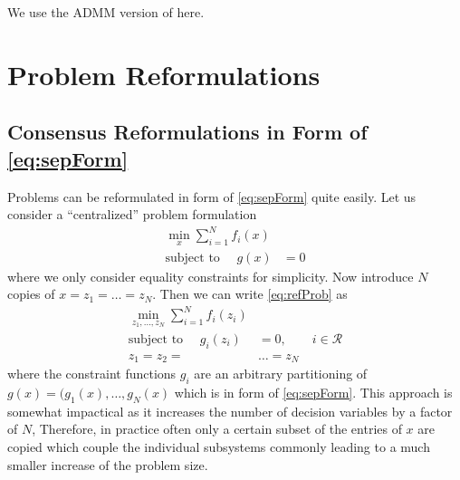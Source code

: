 \documentclass[]{scrartcl}
\begin{document}
We use the ADMM version of \cite{Houska} here. 






\section{Problem Reformulations}
\subsection{Consensus Reformulations in Form of \eqref{eq:sepForm}}

Problems can be reformulated in form of \eqref{eq:sepForm} quite easily.
Let us consider a ``centralized'' problem formulation
\begin{subequations} \label{eq:refProb}
	\begin{align} 
	\min_{x} \sum_{i=1}^N  f_i(x)& \\
	\text{subject to }\quad  g(x)&= 0 
	\end{align}
\end{subequations}
where we only consider equality constraints for simplicity.
Now introduce $N$ copies of $x=z_1=\dots=z_N$.
Then we can write \eqref{eq:refProb} as
\begin{align*} 
\min_{z_1,\dots,z_N} \sum_{i=1}^N  f_i(z_i)& \\
\text{subject to }\quad  g_i(z_i)&= 0, \qquad i \in \mathcal{R} \\
z_1=z_2=&\dots=z_N
\end{align*}
where the constraint functions $g_i$ are an arbitrary partitioning of $g(x)=(g_1(x),\dots,g_N(x)$ which is in form of \eqref{eq:sepForm}.
This approach is somewhat impactical as it increases the number of decision variables by a factor of $N$, 
Therefore, in practice often only a certain subset of the entries of $x$ are copied which couple the individual subsystems commonly leading to a much smaller increase of the problem size.
\end{document}
